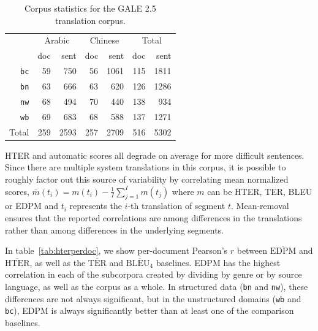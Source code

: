 \documentclass{kluwer}    %
\begin{document}
\begin{article}
\begin{table}
  \begin{tabular}{r|rr|rr|rr}
    \hline
     & \multicolumn{2}{c|}{Arabic} & \multicolumn{2}{c|}{Chinese}
     & \multicolumn{2}{c}{Total}\\
     & doc & sent & doc & sent & doc   & sent\\
     \hline
     \texttt{bc}    & 59  & 750 & 56 & 1061 & 115 & 1811\\
     \texttt{bn}    & 63  & 666 & 63 & 620  & 126 & 1286\\
     \texttt{nw}    & 68  & 494 & 70 & 440  & 138 & 934 \\
     \texttt{wb}    & 69  & 683 & 68 & 588  & 137 & 1271\\
     \hline
     Total & 259 & 2593& 257& 2709 & 516 & 5302\\
     \hline
  \end{tabular}
  \caption{Corpus statistics for the GALE 2.5 translation
    corpus.}
  \label{tab:galestats}
\end{table}

HTER and automatic scores all degrade on average for more difficult sentences.
Since there are multiple system translations in this corpus, it is possible to 
roughly factor out this source of variability by correlating mean normalized
scores,
$\overline{m}(t_i) = m(t_i) - \frac{1}{I}\sum_{j=1}^Im(t_j)$
where $m$ can be HTER, TER, BLEU or EDPM and $t_i$
represents the $i$-th translation of segment $t$.
Mean-removal ensures
that the reported correlations are among differences in the
translations rather than among differences in the underlying segments.

In table~\ref{tab:hterperdoc}, we show per-document Pearson's $r$
between $\overline{\textrm{EDPM}}$ and $\overline{\textrm{HTER}}$, as well as the $\overline{\textrm{TER}}$ and $\overline{\textrm{BLEU}_4}$
baselines. EDPM has the highest correlation in each of the
subcorpora created by dividing by genre or by source language, as well
as the corpus as a whole.   In structured data
(\texttt{bn} and \texttt{nw}), these differences are not always
significant, but in the unstructured domains (\texttt{wb} and
\texttt{bc}), EDPM is always significantly better than at least one of
the comparison baselines.


\end{article}
\end{document}
